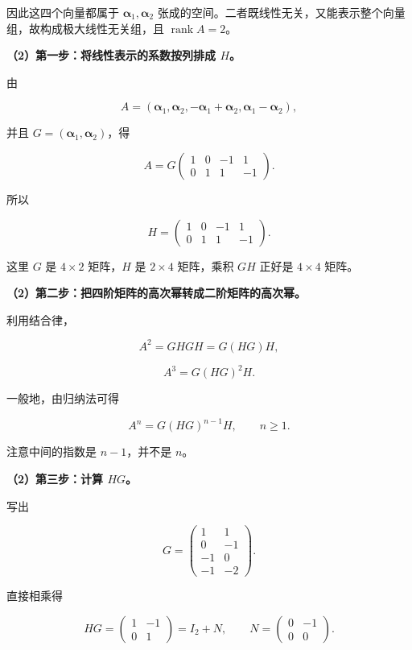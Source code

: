 \documentclass[UTF8,11pt,fontset=windows]{ctexart}
\begin{document}
因此这四个向量都属于 $\boldsymbol{\alpha}_1,\boldsymbol{\alpha}_2$ 张成的空间。二者既线性无关，又能表示整个向量组，故构成极大线性无关组，且 $\operatorname{rank}A=2$。

\textbf{（2）第一步：将线性表示的系数按列排成 $H$。}

由

$$
A=(\boldsymbol{\alpha}_1,\boldsymbol{\alpha}_2,
-\boldsymbol{\alpha}_1+\boldsymbol{\alpha}_2,
\boldsymbol{\alpha}_1-\boldsymbol{\alpha}_2),
$$

并且 $G=(\boldsymbol{\alpha}_1,\boldsymbol{\alpha}_2)$，得

$$
A=G\begin{pmatrix}1&0&-1&1\\0&1&1&-1\end{pmatrix}.
$$

所以

$$
\boxed{H=\begin{pmatrix}1&0&-1&1\\0&1&1&-1\end{pmatrix}}.
$$

这里 $G$ 是 $4\times2$ 矩阵，$H$ 是 $2\times4$ 矩阵，乘积 $GH$ 正好是 $4\times4$ 矩阵。

\textbf{（2）第二步：把四阶矩阵的高次幂转成二阶矩阵的高次幂。}

利用结合律，

$$
A^2=GHGH=G(HG)H,
$$

$$
A^3=G(HG)^2H.
$$

一般地，由归纳法可得

$$
A^n=G(HG)^{n-1}H,\qquad n\ge1.
$$

注意中间的指数是 $n-1$，并不是 $n$。

\textbf{（2）第三步：计算 $HG$。}

写出

$$
G=\begin{pmatrix}1&1\\0&-1\\-1&0\\-1&-2\end{pmatrix}.
$$

直接相乘得

$$
HG=\begin{pmatrix}1&-1\\0&1\end{pmatrix}
=I_2+N,
\qquad
N=\begin{pmatrix}0&-1\\0&0\end{pmatrix}.
$$
\end{document}
